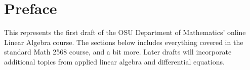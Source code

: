 \section{Preface}

This represents the first draft of the OSU Department of Mathematics' online Linear Algebra course. The sections below includes everything covered in the standard Math 2568 course, and a bit more. Later drafts will incorporate additional topics from applied linear algebra and differential equations.


